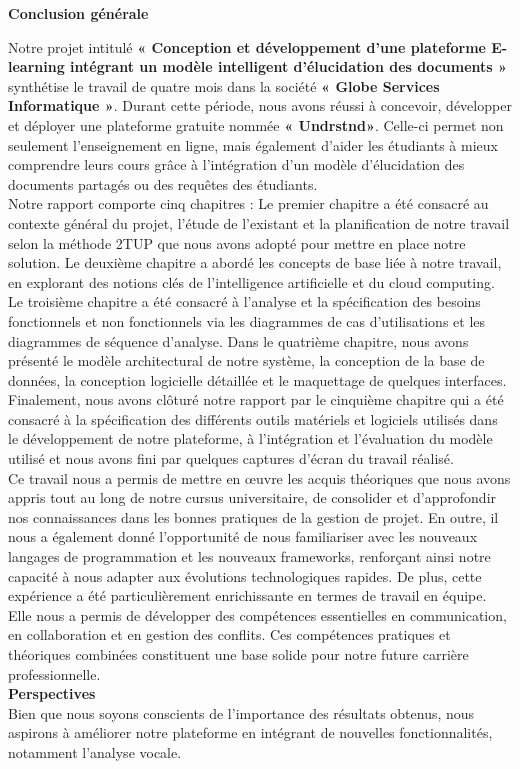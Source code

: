 \thispagestyle{plain} 
\begin{center}
    \textbf{\Huge Conclusion générale}
\end{center}
  
Notre projet intitulé \textbf{« Conception et développement d’une plateforme E-learning intégrant un modèle intelligent d’élucidation des documents »} synthétise le travail de quatre mois dans la société \textbf{« Globe Services Informatique »}. Durant cette période, nous avons réussi à concevoir, développer et déployer  une plateforme  gratuite nommée \textbf{« Undrstnd»}. Celle-ci permet non seulement l’enseignement en ligne, mais également d’aider les étudiants à mieux comprendre leurs cours grâce à l'intégration d’un modèle d’élucidation des documents partagés ou des requêtes des étudiants. \\

Notre rapport comporte cinq chapitres : Le premier chapitre a été consacré au contexte général du projet, l’étude de l’existant et la planification de notre travail selon la méthode 2TUP que nous avons adopté pour mettre en place notre solution. Le deuxième chapitre a abordé les concepts de base liée à notre travail, en explorant des notions clés de l’intelligence artificielle et du cloud computing. Le troisième chapitre a été consacré à l’analyse et la spécification des besoins fonctionnels et non fonctionnels via les diagrammes de cas d’utilisations et les diagrammes de séquence d’analyse. Dans le quatrième chapitre, nous avons présenté le modèle architectural de notre système, la conception de la base de données, la conception logicielle détaillée et le maquettage de quelques interfaces. Finalement, nous avons clôturé notre rapport par le cinquième chapitre qui a été consacré à la spécification des différents outils matériels et logiciels utilisés dans le développement de notre plateforme, à l’intégration et l’évaluation du modèle utilisé et nous avons fini par quelques captures d’écran du travail réalisé.\\

Ce travail nous a permis de mettre en œuvre les acquis théoriques que nous avons appris tout au long de notre cursus universitaire, de consolider et d’approfondir nos connaissances dans les bonnes pratiques de la gestion de projet. En outre, il nous a également donné l'opportunité de nous familiariser avec les nouveaux langages de programmation et les nouveaux frameworks, renforçant ainsi notre capacité à nous adapter aux évolutions technologiques rapides. De plus, cette expérience a été particulièrement enrichissante en termes de travail en équipe. Elle nous a permis de développer des compétences essentielles en communication, en collaboration et en gestion des conflits. Ces compétences pratiques et théoriques combinées constituent une base solide pour notre future carrière professionnelle.\\

\noindent \textbf{Perspectives}\\
Bien que nous soyons conscients de l'importance des résultats obtenus, nous aspirons à améliorer notre plateforme en intégrant de nouvelles fonctionnalités, notamment l'analyse vocale. 
